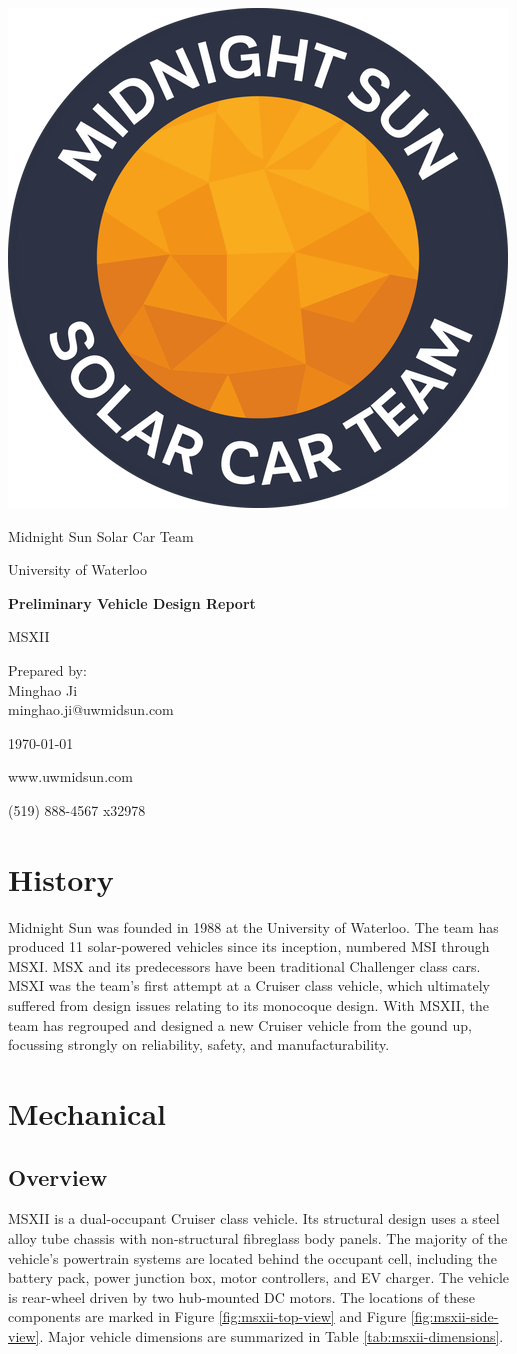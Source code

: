 \documentclass[10pt]{article}
\newcommand\thetitle{Preliminary Vehicle Design Report}
\newcommand\theauthor{Midnight Sun Solar Car Team}
\newcommand\thedate{\today}
\begin{document}
\begin{titlepage}
	\vspace*{2cm}
	\centering
	\includegraphics[width=.25\textwidth]{./figures/midnightSunLogoCircle.png}\par
	\vspace{1.5cm}
	{\LARGE \theauthor \par}
	{\large University of Waterloo\par}
	\vspace{2.2cm}
	{\huge\bfseries \thetitle\par} 
	\vspace{0.2cm}
	\large MSXII %
	\vspace{2.2cm}	
	\par Prepared by:\\
	Minghao Ji\\
	minghao.ji@uwmidsun.com\par
	\thedate\par
	\vfill
	www.uwmidsun.com \par
	(519) 888-4567 x32978
\end{titlepage}

\tableofcontents
\listoffigures
\listoftables

\section{History}
Midnight Sun was founded in 1988 at the University of Waterloo. The team has produced 11 solar-powered vehicles since its inception, numbered MSI through MSXI. MSX and its predecessors have been traditional Challenger class cars. MSXI was the team's first attempt at a Cruiser class vehicle, which ultimately suffered from design issues relating to its monocoque design. With MSXII, the team has regrouped and designed a new Cruiser vehicle from the gound up, focussing strongly on reliability, safety, and manufacturability.

\section{Mechanical}
\subsection{Overview}
MSXII is a dual-occupant Cruiser class vehicle. Its structural design uses a steel alloy tube chassis with non-structural fibreglass body panels. The majority of the vehicle's powertrain systems are located behind the occupant cell, including the battery pack, power junction box, motor controllers, and EV charger. The vehicle is rear-wheel driven by two hub-mounted DC motors. The locations of these components are marked in Figure \ref{fig:msxii-top-view} and Figure \ref{fig:msxii-side-view}. Major vehicle dimensions are summarized in Table \ref{tab:msxii-dimensions}.
\end{document}
